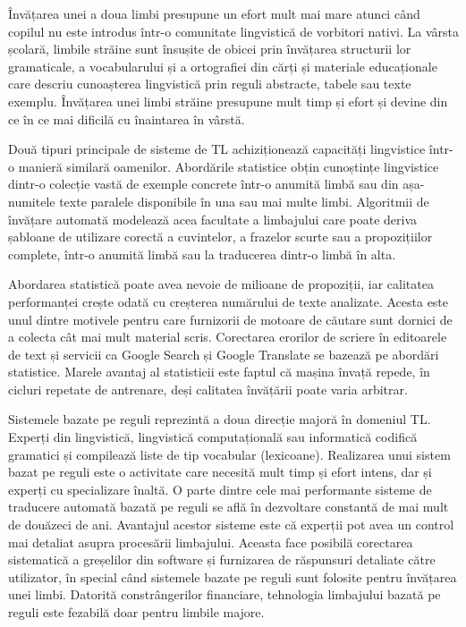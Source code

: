 \begin{multicols}{2}
Învățarea unei a doua limbi presupune un efort mult mai mare atunci când copilul nu este introdus într-o comunitate lingvistică de vorbitori nativi. La vârsta școlară, limbile străine sunt însușite de obicei prin învățarea structurii lor gramaticale, a vocabularului și a ortografiei din cărți și materiale educaționale care descriu cunoașterea lingvistică prin reguli abstracte, tabele sau texte exemplu. Învățarea unei limbi străine presupune mult timp și efort și devine din ce în ce mai dificilă cu înaintarea în vârstă.

Două tipuri principale de sisteme de TL achiziționează capacități lingvistice într-o manieră similară oamenilor. Abordările statistice obțin cunoștințe lingvistice dintr-o colecție vastă de exemple concrete într-o anumită limbă sau din așa-numitele texte paralele disponibile în una sau mai multe limbi. Algoritmii de învățare automată modelează acea facultate a limbajului care poate deriva șabloane de utilizare corectă a cuvintelor, a frazelor scurte sau a propozițiilor complete, într-o anumită limbă sau la traducerea dintr-o limbă în alta.

Abordarea statistică poate avea nevoie de milioane de propoziții, iar calitatea performanței crește odată cu creșterea numărului de texte analizate. Acesta este unul dintre motivele pentru care furnizorii de motoare de căutare sunt dornici de a colecta cât mai mult material scris. Corectarea erorilor de scriere în editoarele de text și servicii ca Google Search și Google Translate se bazează pe abordări statistice. Marele avantaj al statisticii este faptul că mașina învață repede, în cicluri repetate de antrenare, deși calitatea învățării poate varia arbitrar.

Sistemele bazate pe reguli reprezintă a doua direcție majoră în domeniul TL. Experți din lingvistică, lingvistică computațională sau informatică codifică gramatici și compilează liste de tip vocabular (lexicoane). Realizarea unui sistem bazat pe reguli este o activitate care necesită mult timp și efort intens, dar și experți cu specializare înaltă. O parte dintre cele mai performante sisteme de traducere automată bazată pe reguli se află în dezvoltare constantă de mai mult de douăzeci de ani. Avantajul acestor sisteme este că experții pot avea un control mai detaliat asupra procesării limbajului. Aceasta face posibilă corectarea sistematică a greșelilor din software și furnizarea de răspunsuri detaliate către utilizator, în special când sistemele bazate pe reguli sunt folosite pentru învățarea unei limbi. Datorită constrângerilor financiare, tehnologia limbajului bazată pe reguli este fezabilă doar pentru limbile majore.


\end{multicols}
